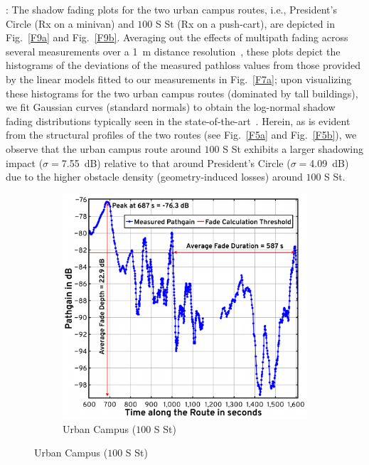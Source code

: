 \documentclass[10pt, twocolumn]{IEEEtran}
\begin{document}
{: The shadow fading plots for the two urban campus routes, i.e., President's Circle (Rx on a minivan) and $100$ S St (Rx on a push-cart), are depicted in Fig.~\ref{F9a} and Fig.~\ref{F9b}. Averaging out the effects of multipath fading across several measurements over a \SI{1}{\meter} distance resolution~\cite{Averaging_Threshold}, these plots depict the histograms of the deviations of the measured pathloss values from those provided by the linear models fitted to our measurements in Fig.~\ref{F7a}; upon visualizing these histograms for the two urban campus routes (dominated by tall buildings), we fit Gaussian curves (standard normals) to obtain the log-normal shadow fading distributions typically seen in the state-of-the-art~\cite{DopplerHST}. Herein, as is evident from the structural profiles of the two routes (see Fig.~\ref{F5a} and Fig.~\ref{F5b}), we observe that the urban campus route around $100$ S St exhibits a larger shadowing impact ($\sigma{=}$\SI{7.55}{\deci\bel}) relative to that around President's Circle ($\sigma{=}$\SI{4.09}{\deci\bel}) due to the higher obstacle density (geometry-induced losses) around $100$ S St.
\begin{figure} [t]
    \centering
    \begin{subfigure}{0.5\linewidth}
        \centering
        \includegraphics[width=1.0\linewidth]{figs/urban_campus_pathgain_vs_time_gap_annotated.pdf}
        \caption{Urban Campus ($100$ S St)}

\end{subfigure}
\end{figure}}
\end{document}
